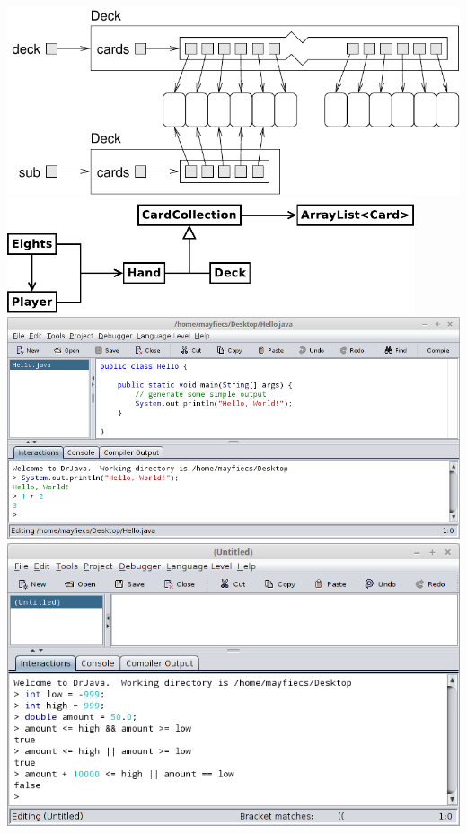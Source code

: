 \documentclass[12pt]{book}
\begin{document}
\clearpage%
\includegraphics{./figs/subdeck.pdf}
\clearpage%
\includegraphics[width=0.9\textwidth]{./figs/uml1.pdf}
\clearpage%
\renewcommand{\chaptermark}[1]{\markboth{Appendix \thechapter ~~ #1}{}}
\includegraphics[width=\textwidth]{./figs/drjava-hello.png}
\clearpage%
\includegraphics[width=\textwidth]{./figs/drjava-logic.png}
\end{document}
